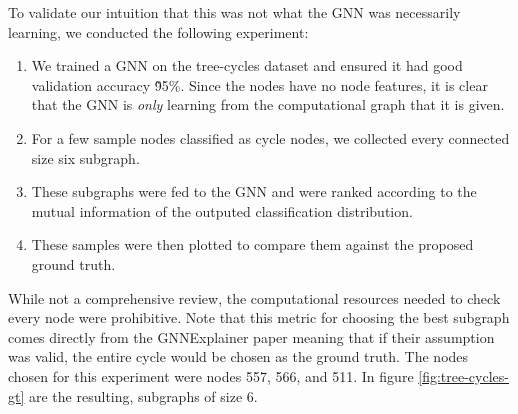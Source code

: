To validate our intuition that this was not what the GNN was necessarily learning, we conducted the following experiment:
\begin{enumerate}
	\item We trained a GNN on the tree-cycles dataset and ensured it had good validation accuracy \~95\%. Since the nodes have no node features, it is clear that the GNN is \textit{only} learning from the computational graph that it is given.
	\item For a few sample nodes classified as cycle nodes, we collected every connected size six subgraph.
	\item These subgraphs were fed to the GNN and were ranked according to the mutual information of the outputed classification distribution.
	\item These samples were then plotted to compare them against the proposed ground truth.
\end{enumerate}
While not a comprehensive review, the computational resources needed to check every node were prohibitive. Note that this metric for choosing the best subgraph comes directly from the GNNExplainer paper meaning that if their assumption was valid, the entire cycle would be chosen as the ground truth. The nodes chosen for this experiment were nodes 557, 566, and 511. In figure \ref{fig:tree-cycles-gt} are the resulting, subgraphs of size 6.
